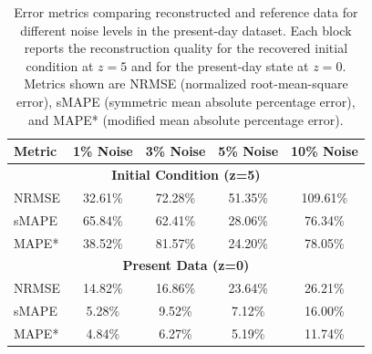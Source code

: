 \begin{table}[h!]
\centering
\begin{tabular}{lcccc}
\hline
\textbf{Metric} & \textbf{1\% Noise} & \textbf{3\% Noise} & \textbf{5\% Noise} & \textbf{10\% Noise} \\
\hline
\multicolumn{5}{c}{\textbf{Initial Condition (z=5)}} \\
NRMSE & 32.61\% & 72.28\% & 51.35\% & 109.61\% \\
sMAPE & 65.84\% & 62.41\% & 28.06\% & 76.34\% \\
MAPE* & 38.52\% & 81.57\% & 24.20\% & 78.05\% \\
\hline
\multicolumn{5}{c}{\textbf{Present Data (z=0)}} \\
NRMSE & 14.82\% & 16.86\% & 23.64\% & 26.21\% \\
sMAPE & 5.28\% & 9.52\% & 7.12\% & 16.00\% \\
MAPE* & 4.84\% & 6.27\% & 5.19\% & 11.74\% \\
\hline
\end{tabular}

\caption{
Error metrics comparing reconstructed and reference data for different noise levels 
in the present-day dataset. Each block reports the reconstruction quality for the 
recovered initial condition at $z=5$ and for the present-day state at $z=0$. 
Metrics shown are NRMSE (normalized root-mean-square error), sMAPE (symmetric mean 
absolute percentage error), and MAPE* (modified mean absolute percentage error).
}

\label{tab:metrics1}
\end{table}